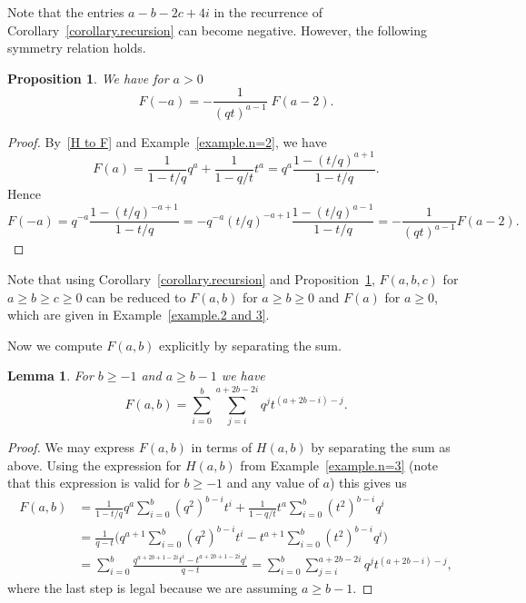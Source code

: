 \documentclass[11pt,reqno]{amsart}
\newtheorem{lemma}[theorem]{Lemma}
\newtheorem{proposition}[theorem]{Proposition}
\theoremstyle{definition}
\numberwithin{equation}{section}
\begin{document}
Note that the entries $a-b-2c+4i$ in the recurrence of Corollary~\ref{corollary.recursion} can become negative.
However, the following symmetry relation holds.

\begin{proposition}
\label{proposition.negative}
We have for $a>0$
\[
	F(-a) = - \frac{1}{(qt)^{a-1}} \; F(a-2).
\]
\end{proposition}

\begin{proof}
By~\eqref{H to F} and Example~\ref{example.n=2}, we have
\[
	F(a) = \frac{1}{1-t/q} q^{a} + \frac{1}{1-q/t} t^{a} = q^a \frac{1-(t/q)^{a+1}}{1-t/q}.
\]
Hence
\begin{equation*}
	F(-a) = q^{-a} \frac{1-(t/q)^{-a+1}}{1-t/q} = -q^{-a}(t/q)^{-a+1} \frac{1-(t/q)^{a-1}}{1-t/q}
	= - \frac{1}{(qt)^{a-1}} F(a-2).
\end{equation*}
\end{proof}

Note that using Corollary~\ref{corollary.recursion} and Proposition~\ref{proposition.negative}, $F(a,b,c)$ for 
$a\geqslant b \geqslant c \geqslant 0$ can be reduced to $F(a,b)$ for $a\geqslant b \geqslant 0$ and
$F(a)$ for $a\geqslant 0$, which are given in Example~\ref{example.2 and 3}.

Now we compute $F(a,b)$ explicitly by separating the sum.
\begin{lemma}\label{F(a,b)}
For $b \geqslant -1$ and $a \geqslant b-1$ we have 
\begin{equation*} 
	F(a,b)= \sum_{i=0}^b \sum_{j=i}^{a+2b-2i}q^{j}t^{(a+2b-i)-j}.
 \end{equation*}
\end{lemma}

\begin{proof}
We may express $F(a,b)$ in terms of $H(a,b)$ by separating the sum as above.  Using the expression for $H(a,b)$ 
from Example~\ref{example.n=3} (note that this expression is valid for $b \geqslant -1$ and any value of $a$) this gives us
\begin{equation*}
\begin{split}
	F(a,b) &= \frac{1}{1-t/q}q^a\sum_{i=0}^b (q^2)^{b-i}t^i+\frac{1}{1-q/t}t^a\sum_{i=0}^b (t^2)^{b-i}q^i \\
	&=\frac{1}{q-t}\bigg(q^{a+1}\sum_{i=0}^b (q^2)^{b-i}t^i-t^{a+1}\sum_{i=0}^b (t^2)^{b-i}q^i\bigg)\\
	&=\sum_{i=0}^b \frac{q^{a+2b+1-2i}t^i-t^{a+2b+1-2i} q^i}{q-t}=\sum_{i=0}^b \sum_{j=i}^{a+2b-2i}q^{j}t^{(a+2b-i)-j},
\end{split}
\end{equation*}
where the last step is legal because we are assuming $a \geqslant b-1$.
\end{proof}
\end{document}
